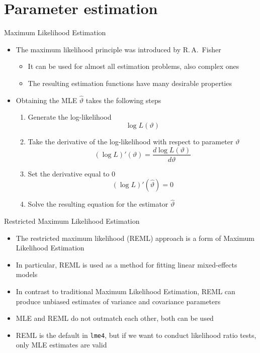 \documentclass[aspectratio=169]{beamer}
\begin{document}
\section{Parameter estimation}

\begin{frame}{Maximum Likelihood Estimation}
  \begin{itemize}
    \item The maximum likelihood principle was introduced by
      R.\,A.\ Fisher
      \begin{itemize}
      \item It can be used for almost all estimation problems, also complex
        ones
      \item The resulting estimation functions have many desirable
        properties
      \end{itemize}
    \item Obtaining the MLE $\hat{\vartheta}$ takes the
      following steps\\[1ex]
    \begin{enumerate}
      \item Generate the log-likelihood
      \[
        \log L(\vartheta)
      \]
      \vspace{-3ex}
      \item Take the derivative of the log-likelihood with respect to
        parameter $\vartheta$
      \[
        (\log L)' (\vartheta) = \frac{d \log L(\vartheta)}{d \vartheta}
      \]
      \vspace{-3ex}
      \item Set the derivative equal to 0
      \[
        (\log L)' (\hat{\vartheta}) = 0
      \]
      \vspace{-3ex}
      \item Solve the resulting equation for the estimator $\hat{\vartheta}$
    \end{enumerate}
  \end{itemize}
\end{frame}

\begin{frame}{Restricted Maximum Likelihood Estimation}
  \begin{itemize}
    \item The restricted maximum likelihood (REML) approach is a form of Maximum
      Likelihood Estimation
    \item In particular, REML is used as a method for fitting linear
      mixed-effects models
    \item In contrast to traditional Maximum Likelihood Estimation, REML can
      produce unbiased estimates of variance and covariance parameters
    \item MLE and REML do not outmatch each other, both can be used
    \item REML is the default in \texttt{lme4}, but if we want to conduct
      likelihood ratio tests, only MLE estimates are valid
  \end{itemize}
\end{frame}
\end{document}
